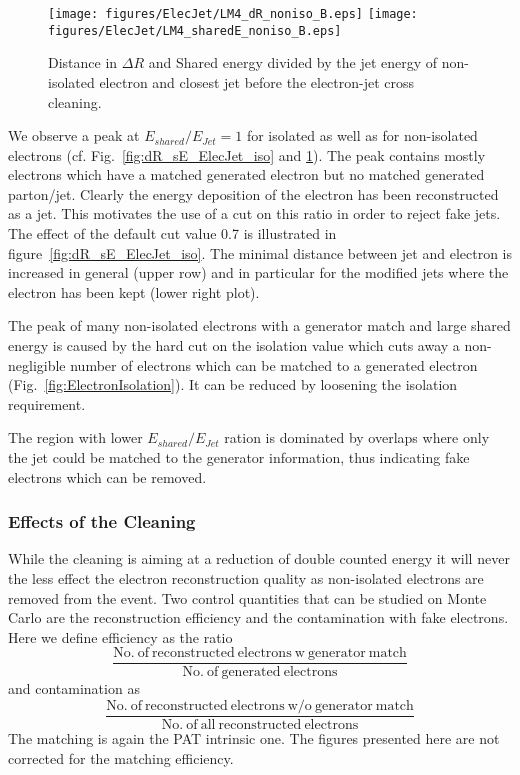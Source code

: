 \documentclass{cmspaper}
\begin{document}
\begin{figure}[hb]
\begin{center}
    \texttt{[image: figures/ElecJet/LM4\_dR\_noniso\_B.eps]}
    \texttt{[image: figures/ElecJet/LM4\_sharedE\_noniso\_B.eps]}
    \caption{Distance in $\Delta R$ and Shared energy divided by the jet energy
    of non-isolated electron and closest jet before the electron-jet cross cleaning.}
\label{fig:dR_sE_ElecJet_noniso}
\end{center}
\end{figure}

We observe a peak at $E_{shared}/E_{Jet}=1$ for isolated as well as for
non-isolated electrons (cf. Fig.~\ref{fig:dR_sE_ElecJet_iso} and
\ref{fig:dR_sE_ElecJet_noniso}). The peak contains mostly electrons which have a
matched generated electron but no matched generated parton/jet. Clearly the
energy deposition of the electron has been reconstructed as a jet. This
motivates the use of a cut on this ratio in order to reject fake jets.  The
effect of the default cut value 0.7 is illustrated in figure~\ref{fig:dR_sE_ElecJet_iso}.
The minimal distance between jet and electron is increased in general (upper
row) and in particular for the modified jets where the electron has been kept
(lower right plot).

The peak of many non-isolated electrons with a generator match and large shared
energy is caused by the hard cut on the isolation value which cuts away a
non-negligible number of electrons which can be matched to a generated electron
(Fig.~\ref{fig:ElectronIsolation}). It can be reduced by loosening the
isolation requirement.

The region with lower $E_{shared}/E_{Jet}$ ration is dominated by overlaps
where only the jet could be matched to the generator information, thus
indicating fake electrons which can be removed.

\clearpage

\subsubsection{Effects of the Cleaning}

While the cleaning is aiming at a reduction of double counted energy it will
never the less effect the electron reconstruction quality as non-isolated
electrons are removed from the event. Two control quantities that can be
studied on Monte Carlo are the reconstruction efficiency and the contamination
with fake electrons. Here we define efficiency as the ratio 
\[\frac{\mathrm{No.\ of\ reconstructed\ electrons\ w\ generator\ match}}{\mathrm{No.\ of\ generated\ electrons}}\]
and contamination as
\[\frac{\mathrm{No.\ of\ reconstructed\ electrons\ w/o\ generator\ match
}}{\mathrm{No.\ of\ all\ reconstructed\ electrons}}\]
The matching is again the PAT intrinsic one. The figures presented here are not
corrected for the matching efficiency.
\end{document}
